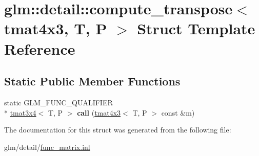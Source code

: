 \hypertarget{structglm_1_1detail_1_1compute__transpose_3_01tmat4x3_00_01T_00_01P_01_4}{\section{glm\-:\-:detail\-:\-:compute\-\_\-transpose$<$ tmat4x3, T, P $>$ Struct Template Reference}
\label{structglm_1_1detail_1_1compute__transpose_3_01tmat4x3_00_01T_00_01P_01_4}
}
\subsection*{Static Public Member Functions}
\begin{DoxyCompactItemize}
\item 
\hypertarget{structglm_1_1detail_1_1compute__transpose_3_01tmat4x3_00_01T_00_01P_01_4_a07d20015b9385bb4961cbb4b6e9f57ad}{static G\-L\-M\-\_\-\-F\-U\-N\-C\-\_\-\-Q\-U\-A\-L\-I\-F\-I\-E\-R \\*
\hyperlink{structglm_1_1tmat3x4}{tmat3x4}$<$ T, P $>$ {\bfseries call} (\hyperlink{structglm_1_1tmat4x3}{tmat4x3}$<$ T, P $>$ const \&m)}\label{structglm_1_1detail_1_1compute__transpose_3_01tmat4x3_00_01T_00_01P_01_4_a07d20015b9385bb4961cbb4b6e9f57ad}

\end{DoxyCompactItemize}


The documentation for this struct was generated from the following file\-:\begin{DoxyCompactItemize}
\item 
glm/detail/\hyperlink{func__matrix_8inl}{func\-\_\-matrix.\-inl}\end{DoxyCompactItemize}
